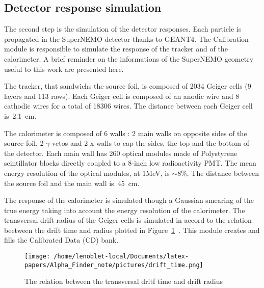 \documentclass[main.tex]{subfiles}
\begin{document}
\FloatBarrier


\subsection{Detector response simulation}\label{sec:DectectorResponseBi214}


\noindent The second step is the simulation of the detector responses. Each particle is propagated in the SuperNEMO detector thanks to GEANT4. The Calibration module is responsible to simulate the response of the tracker and of the calorimeter. A brief reminder on the informations of the SuperNEMO geometry useful to this work are presented here.


\bigskip


\noindent The tracker, that sandwichs the source foil, is composed of 2034 Geiger cells (9 layers and 113 raws). Each Geiger cell is composed of an anodic wire and 8 cathodic wires for a total of 18306 wires. The distance between each Geiger cell is~2.1~cm.


\bigskip


\noindent The calorimeter is composed of 6 walls : 2 main walls on opposite sides of the source foil, 2 $\gamma$-vetos and 2 x-walls to cap the sides, the top and the bottom of the detector. Each main wall has 260 optical modules made of Polystyrene scintillator blocks directly coupled to a 8-inch low radioactivity PMT. The mean energy resolution of the optical modules, at 1MeV, is $\sim$8$\%$. The distance between the source foil and the main wall is~45~cm.   


\bigskip


\noindent The response of the calorimeter is simulated though a Gaussian smearing of the true energy taking into account the energy resolution of the calorimeter.  The transversal drift radius of the Geiger cells is simulated in accord to the relation beetween the drift time and radius plotted in Figure~\ref{drift_time}~\cite{DriftTimeModel}. This module creates and fills the Calibrated Data (CD) bank.


\begin{figure}[h!]
\begin{center}
\texttt{[image: /home/lenoblet-local/Documents/latex-papers/Alpha\_Finder\_note/pictures/drift\_time.png]}
\caption{The relation between the transversal dritf time and drift radius}
\label{drift_time}
\end{center}
\end{figure}
\end{document}
